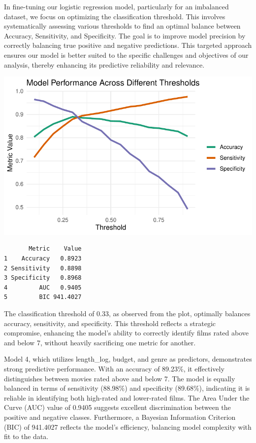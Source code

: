 \documentclass[
  11pt,
]{article}
\begin{document}
In fine-tuning our logistic regression model, particularly for an
imbalanced dataset, we focus on optimizing the classification threshold.
This involves systematically assessing various thresholds to find an
optimal balance between Accuracy, Sensitivity, and Specificity. The goal
is to improve model precision by correctly balancing true positive and
negative predictions. This targeted approach ensures our model is better
suited to the specific challenges and objectives of our analysis,
thereby enhancing its predictive reliability and relevance.

\includegraphics{Group_07_Analysis_files/figure-pdf/unnamed-chunk-25-1.pdf}

\begin{verbatim}
       Metric    Value
1    Accuracy   0.8923
2 Sensitivity   0.8898
3 Specificity   0.8968
4         AUC   0.9405
5         BIC 941.4027
\end{verbatim}

The classification threshold of 0.33, as observed from the plot,
optimally balances accuracy, sensitivity, and specificity. This
threshold reflects a strategic compromise, enhancing the model's ability
to correctly identify films rated above and below 7, without heavily
sacrificing one metric for another.

Model 4, which utilizes length\_log, budget, and genre as predictors,
demonstrates strong predictive performance. With an accuracy of 89.23\%,
it effectively distinguishes between movies rated above and below 7. The
model is equally balanced in terms of sensitivity (88.98\%) and
specificity (89.68\%), indicating it is reliable in identifying both
high-rated and lower-rated films. The Area Under the Curve (AUC) value
of 0.9405 suggests excellent discrimination between the positive and
negative classes. Furthermore, a Bayesian Information Criterion (BIC) of
941.4027 reflects the model's efficiency, balancing model complexity
with fit to the data.
\end{document}
